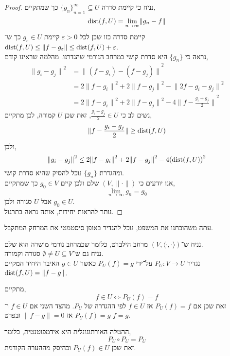 \begin{proof}
	נניח כי קיימת סדרה ${\{ g_n \}}_{n = 1}^\infty \subseteq U$ כך שמתקיים,
	\[
		\operatorname{dist}(f, U)
		= \lim_{n \to \infty} \lVert g_n - f \rVert
	\]
	קיימת סדרה כזו שכן לכל $\varepsilon > 0$ קיימת $g_{\varepsilon} \in U$ כך ש־$\operatorname{dist}(f, U) \le \lVert f - g_{\varepsilon} \rVert \le \operatorname{dist}(f, U) + \varepsilon$. \\
	נראה כי $\{ g_n \}$ היא סדרת קושי במרחב הנורמי שהגדרנו.
	מהלמה שראינו קודם,
	\begin{align*}
		{\lVert g_i - g_j \rVert}^2
		& = {\lVert (f - g_i) - (f - g_j) \rVert}^2 \\
		& = 2 {\lVert f - g_i \rVert}^2 + 2 {\lVert f - g_j \rVert}^2 - {\lVert 2f - g_i - g_j \rVert}^2 \\
		& = 2 {\lVert f - g_i \rVert}^2 + 2 {\lVert f - g_j \rVert}^2 - 4 {\lVert f - \frac{g_i + g_j}{2} \rVert}^2
	\end{align*}
	נשים לב כי $\frac{g_i + g_j}{2} \in U$, זאת שכן $U$ קמורה,
	לכן מתקיים,
	\[
		\lVert f - \frac{g_i - g_j}{2} \rVert
		\ge \operatorname{dist}(f, U)
	\]
	ולכן,
	\[
		{\lVert g_i - g_j \rVert}^2
		\le 2 {\lVert f - g_i \rVert}^2 + 2 {\lVert f - g_j \rVert}^2 - 4 {(\operatorname{dist}(f, U))}^2
	\]
	ומהגדרת $\{ g_n \}$ נוכל להסיק שהיא סדרת קושי. \\
	אנו יודעים כי $(V, \lVert \cdot \rVert)$ שלם ולכן קיים $g_0 \in V$ כך שמתקיים,
	\[
		\lim_{n \to \infty} g_n = g_0
	\]
	אבל $U$ סגורה ולכן $g_0 \in U$. \\
	נותר להראות יחידות, אותה נראה בתרגול.
\end{proof}
עתה משהוכחנו את המשפט, נוכל להגדיר באופן סיסטמטי את המרחק המתקבל.
\begin{definition}
	נניח ש־$(V, \langle \cdot, \cdot \rangle)$ מרחב הילברט, כלומר שכמרחב נורמי מושרה הוא שלם. \\
	נניח גם ש־$\emptyset \ne U \subseteq V$ סגורה וקמורה. \\
	נגדיר $P_U : V \to U$ על־ידי $P_U(f) = g$ כאשר $g \in U$ האיבר היחיד המקיים $\operatorname{dist}(f, U) = \lVert f - g \rVert$.
\end{definition}
\begin{remark}
	מתקיים,
	\[
		f \in U
		\iff P_U(f) = f
	\]
	זאת שכן אם $P_U(f) = f$ אז $f \in U$ לפי ההגדרה של $P_U$.
	מהצד השני אם $f \in U$ ו־$P_U(f) = g$ אז $\lVert f - g \rVert = 0$ ובפרט $f = g$.
\end{remark}
\begin{remark}
	ההטלה האורתוגונלית היא אידמפוטנטית, כלומר,
	\[
		P_U \circ P_U
		= P_U
	\]
	זאת שכן $P_U(f) \in U$ וכהיסק מההערה הקודמת.
\end{remark}
